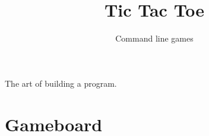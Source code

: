 \documentclass{42-en}
\begin{document}
\title{Tic Tac Toe}
\subtitle{Command line games}


\summary
{
The art of building a program.
}

\maketitle

\tableofcontents


\startexercices



\chapter{Gameboard}
\end{document}
